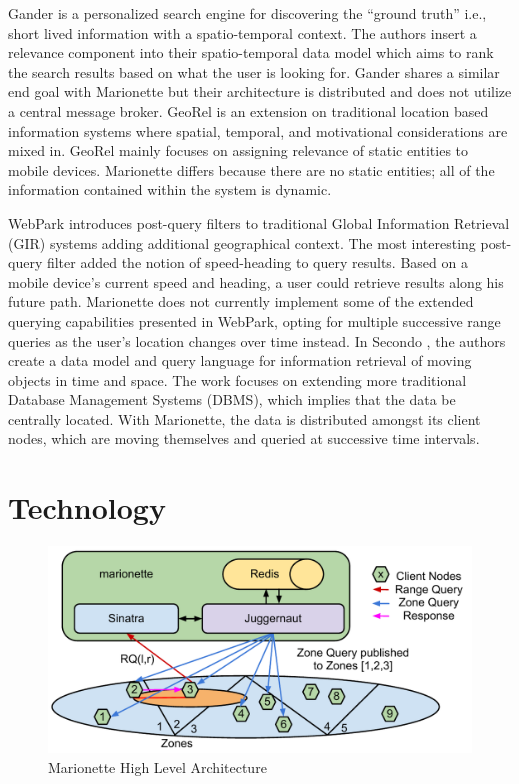\documentclass[12pt]{report}	%
\theoremstyle{definition}
\theoremstyle{remark}
\begin{document}
Gander \cite{michel2011gander} is a personalized search
engine for discovering the ``ground truth'' i.e., short lived information
with a spatio-temporal context. The authors insert a relevance component
into their spatio-temporal data model which aims to rank the search
results based on what the user is looking for. Gander shares a similar
end goal with Marionette but their architecture is distributed and does
not utilize a central message broker. GeoRel
\cite{reichenbacher2009geo} is an extension on
traditional location based information systems where spatial, temporal,
and motivational considerations are mixed in. GeoRel mainly focuses on
assigning relevance of static entities to mobile devices. Marionette
differs because there are no static entities; all of the information
contained within the system is dynamic.

WebPark \cite{mountain2007geo} introduces post-query
filters to traditional Global Information Retrieval (GIR) systems adding
additional geographical context. The most interesting post-query filter
added the notion of speed-heading to query results. Based on a mobile device's
current speed and heading, a user could retrieve results along his future
path. Marionette does not currently implement some of the extended
querying capabilities presented in WebPark, opting for multiple
successive range queries as the user's location changes over time
instead. In Secondo \cite{teixeira2006querying}, the
authors create a data model and query language for information retrieval
of moving objects in time and space. The work focuses on extending more
traditional Database Management Systems (DBMS), which implies that the
data be centrally located. With Marionette, the data is distributed
amongst its client nodes, which are moving themselves and queried at
successive time intervals.

\chapter{Technology}

\begin{figure}[h!]
\centering
\includegraphics[scale=0.8]{0.pdf}
\caption{Marionette High Level Architecture}
\label{hla}
\end{figure}
\end{document}
